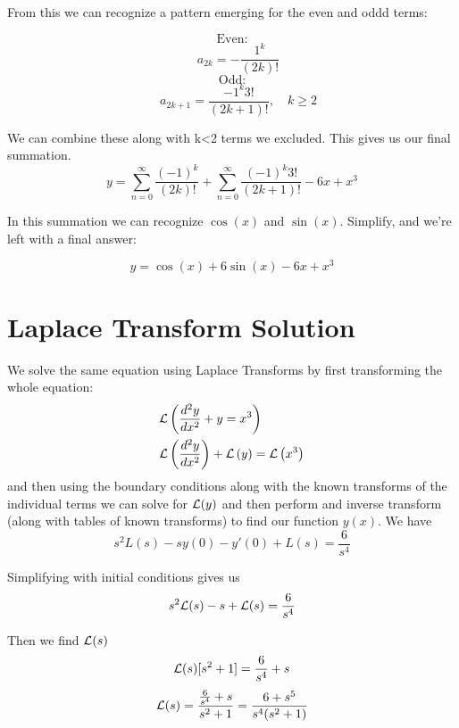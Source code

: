 \documentclass[letterpaper,twocolumn]{article}
\begin{document}
From this we can recognize a pattern emerging for the even and oddd terms:


\[ \text{Even:} \] \[\quad a_{2k} =  -\frac{1^k}{(2k)!} \]
\[ \text{Odd:} \] \[ \quad a_{2k+1} = \frac{-1^k3!}{(2k+1)!}, \quad k \geq 2 \]

We can combine these along with k<2 terms we excluded. This gives us our final summation.
\begin{equation*}
    y=\sum_{n=0}^\infty\frac{(-1)^k}{(2k)!}+\sum_{n=0}^\infty\frac{(-1)^k3!}{(2k+1)!}-6x+x^3
\end{equation*}

In this summation we can recognize $\cos(x)$ and $\sin(x)$. Simplify, and we're left with a final answer:

$$
\boxed{ y = \cos(x) + 6\sin(x) - 6x + x^3}
$$




\section*{Laplace Transform Solution}

We solve the same equation using Laplace Transforms by first
transforming the whole equation:
\begin{align*}
{\cal L}&\left(\frac{d^2 y}{dx^2} + y = x^3\right) \\
{\cal L}&\left(\frac{d^2 y}{dx^2}\right) + 
{\cal L} \left(y\right) = {\cal L} \left(x^3\right)
\end{align*}
and then using the boundary conditions along with the known 
transforms of the individual terms we can solve for ${\cal L}(y)$ 
and then perform and inverse transform (along with tables of 
known transforms) to find our function $y(x)$. We have
\begin{equation}
s^2 L(s) - sy(0) - y'(0) + L(s) = \frac{6}{s^4}
\end{equation}

Simplifying with initial conditions gives us
\begin{equation}
s^2 {\cal L}(s) - s + {\cal L}(s) = \frac{6}{s^4}
\end{equation}

Then we find ${\cal L}(s)$
\begin{equation}
{\cal L}(s)[s^2 + 1] = \frac{6}{s^4} + s
\end{equation}
\begin{equation}
{\cal L}(s) = \frac{\frac{6}{s^4} + s}{s^2 + 1} = \frac{6 + s^5}{s^4(s^2 + 1)}
\end{equation}
\end{document}
